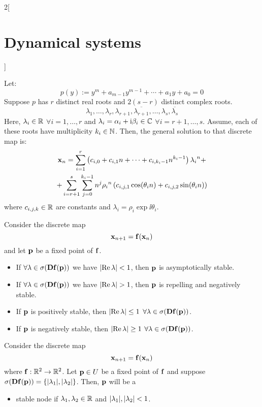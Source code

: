 \documentclass[../../../main_math.tex]{subfiles}
\begin{document}
\begin{multicols}{2}[\section{Dynamical systems}]
\begin{proposition}
\begin{equation*}
    \end{equation*}
    Let:
    $$p(y):=y^m + a_{m-1}y^{m-1} + \cdots + a_1 y + a_0 = 0$$
    Suppose $p$ has $r$ distinct real roots and $2(s-r)$ distinct complex roots.
    $$\lambda_1,\ldots,\lambda_r,\lambda_{r+1},\overline{\lambda_{r+1}},\ldots,\lambda_{s},\overline{\lambda_s}$$
    Here, $\lambda_i\in\mathbb{R}$ $\forall i=1,\ldots,r$ and $\lambda_{i}=\alpha_i+\mathrm{i}\beta_i\in\mathbb{C}$ $\forall i=r+1,\ldots,s$. Assume, each of these roots have multiplicity $k_i\in\mathbb{N}$. Then, the general solution to that discrete map is:
    \begin{multline*}
      \boldsymbol{\mathrm{x}}_n=\sum_{i=1}^r\left(c_{i,0}+c_{i,1}n+\cdots+c_{i,k_i-1}n^{k_i-1}\right){\lambda_i}^n+\\
      +\sum_{i=r+1}^s\sum_{j=0}^{k_i-1}n^{j}{\rho_i}^n\left(c_{i,j,1}\cos(\theta_i n)+c_{i,j,2}\sin(\theta_i n)\right)
    \end{multline*}
    where $c_{i,j,k}\in\mathbb{R}$ are constants and $\lambda_i=\rho_i\exp{\ii\theta_i}$.
  \end{proposition}
  \begin{proposition}
    Consider the discrete map $$\boldsymbol{\mathrm{x}}_{n+1}=\boldsymbol{\mathrm{f}}(\boldsymbol{\mathrm{x}}_n)$$
    and let $\boldsymbol{\mathrm{p}}$ be a fixed point of $\boldsymbol{\mathrm{f}}$.
    \begin{itemize}
      \item If $\forall \lambda\in\sigma(\boldsymbol{\mathrm{Df}}(\boldsymbol{\mathrm{p}}))$ we have $\abs{\Re\lambda}<1$, then $\boldsymbol{\mathrm{p}}$ is asymptotically stable.
      \item If $\forall \lambda\in\sigma(\boldsymbol{\mathrm{Df}}(\boldsymbol{\mathrm{p}}))$ we have $\abs{\Re\lambda}>1$, then $\boldsymbol{\mathrm{p}}$ is repelling and negatively stable.
      \item If $\boldsymbol{\mathrm{p}}$ is positively stable, then $\abs{\Re\lambda}\leq 1$ $\forall\lambda\in\sigma(\boldsymbol{\mathrm{Df}}(\boldsymbol{\mathrm{p}}))$.
      \item If $\boldsymbol{\mathrm{p}}$ is negatively stable, then $\abs{\Re\lambda}\geq 1$ $\forall\lambda\in\sigma(\boldsymbol{\mathrm{Df}}(\boldsymbol{\mathrm{p}}))$.
    \end{itemize}
  \end{proposition}
  \begin{theorem}
    Consider the discrete map $$\boldsymbol{\mathrm{x}}_{n+1}=\boldsymbol{\mathrm{f}}(\boldsymbol{\mathrm{x}}_n)$$ where $\boldsymbol{\mathrm{f}}:\mathbb{R}^2\rightarrow\mathbb{R}^2$. Let $\boldsymbol{\mathrm{p}}\in U$ be a fixed point of $\boldsymbol{\mathrm{f}}$ and suppose $\sigma(\boldsymbol{\mathrm{Df}}(\boldsymbol{\mathrm{p}}))=\{\abs{\lambda_1},\abs{\lambda_2}\}$. Then, $\boldsymbol{\mathrm{p}}$ will be a
    \begin{itemize}
      \item {stable node} if $\lambda_1,\lambda_2\in\mathbb{R}$ and $\abs{\lambda_1},\abs{\lambda_2}<1$.

\end{itemize}
\end{theorem}
\end{multicols}
\end{document}
